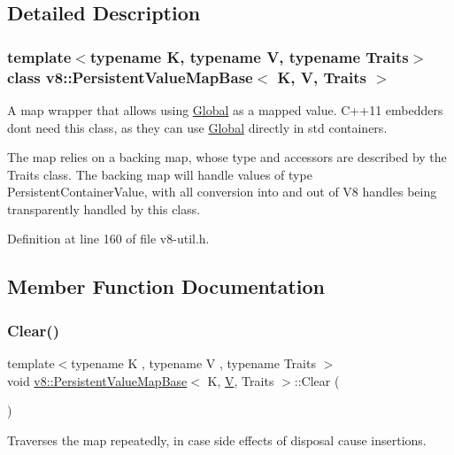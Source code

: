 \subsection{Detailed Description}
\subsubsection*{template$<$typename K, typename V, typename Traits$>$\newline
class v8\+::\+Persistent\+Value\+Map\+Base$<$ K, V, Traits $>$}

A map wrapper that allows using \mbox{\hyperlink{classv8_1_1Global}{Global}} as a mapped value. C++11 embedders don\textquotesingle{}t need this class, as they can use \mbox{\hyperlink{classv8_1_1Global}{Global}} directly in std containers.

The map relies on a backing map, whose type and accessors are described by the Traits class. The backing map will handle values of type Persistent\+Container\+Value, with all conversion into and out of V8 handles being transparently handled by this class. 

Definition at line 160 of file v8-\/util.\+h.



\subsection{Member Function Documentation}
\mbox{\label{classv8_1_1PersistentValueMapBase_a1bf074e7a7c24713c9a3d40ddce89e74}} 
\subsubsection{\texorpdfstring{Clear()}{Clear()}}
{\footnotesize\ttfamily template$<$typename K , typename V , typename Traits $>$ \\
void \mbox{\hyperlink{classv8_1_1PersistentValueMapBase}{v8\+::\+Persistent\+Value\+Map\+Base}}$<$ K, \mbox{\hyperlink{classV}{V}}, Traits $>$\+::Clear (\begin{DoxyParamCaption}{ }\end{DoxyParamCaption})\hspace{0.3cm}{\ttfamily [inline]}}

Traverses the map repeatedly, in case side effects of disposal cause insertions. 

